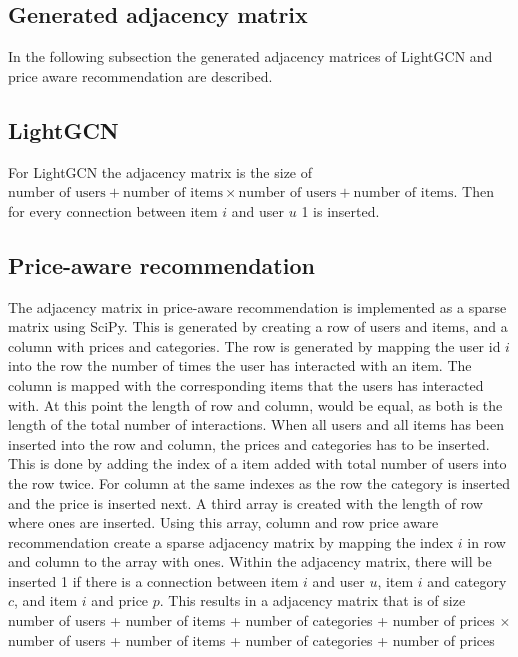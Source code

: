\subsection{Generated adjacency matrix}
In the following subsection the generated adjacency matrices of LightGCN and price aware recommendation are described.

\subsection{LightGCN}
For LightGCN the adjacency matrix is the size of $\textrm{number of users} + \textrm{number of items} \times \textrm{number of users} + \textrm{number of items}$.
Then for every connection between item $i$ and user $u$ 1 is inserted.

\subsection{Price-aware recommendation}
The adjacency matrix in price-aware recommendation is implemented as a sparse matrix using SciPy.
This is generated by creating a row of users and items, and a column with prices and categories.
The row is generated by mapping the user id $i$ into the row the number of times the user has interacted with an item.
The column is mapped with the corresponding items that the users has interacted with.
At this point the length of row and column, would be equal, as both is the length of the total number of interactions.
When all users and all items has been inserted into the row and column, the prices and categories has to be inserted.
This is done by adding the index of a item added with total number of users into the row twice.
For column at the same indexes as the row the category is inserted and the price is inserted next.
A third array is created with the length of row where ones are inserted.
Using this array, column and row price aware recommendation create a sparse adjacency matrix by mapping the index $i$ in row and column to the array with ones.
Within the adjacency matrix, there will be inserted 1 if there is a connection between item $i$ and user $u$, item $i$ and category $c$, and item $i$ and price $p$.
This results in a adjacency matrix that is of size number of users + number of items + number of categories + number of prices $\times$ number of users + number of items + number of categories + number of prices
